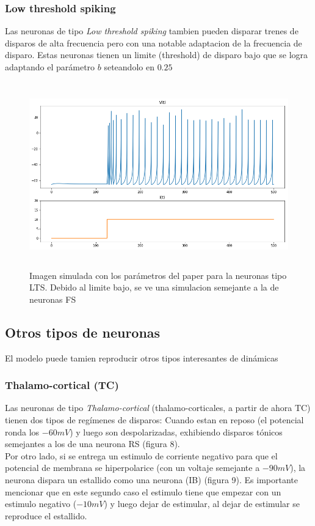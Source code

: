 \documentclass[12pt]{article}
\begin{document}
\subsubsection{Low threshold spiking}
Las neuronas de tipo \textit{Low threshold spiking} tambien pueden disparar trenes de disparos de alta frecuencia pero con una notable adaptacion de la frecuencia de disparo. Estas neuronas tienen un limite (threshold)
de disparo bajo que se logra adaptando el parámetro $b$ seteandolo en $0.25$

\begin{figure}[h!]
    \centering
        \includegraphics[height=8cm]{images/LTS.png}
    \caption[fontsize=2pt]{Imagen simulada con los parámetros del paper para la neuronas tipo LTS. Debido al limite bajo, se ve una simulacion semejante a la de neuronas FS}
\end{figure}
\newpage

\subsection{Otros tipos de neuronas}
El modelo puede tamien reproducir otros tipos interesantes de dinámicas

\subsubsection{Thalamo-cortical (TC)}
Las neuronas de tipo \textit{Thalamo-cortical} (thalamo-corticales, a partir de ahora TC) tienen dos tipos de regímenes de disparos:
Cuando estan en reposo (el potencial ronda los $-60 mV$) y luego son despolarizadas, exhibiendo disparos tónicos semejantes a los de una neurona RS (figura 8). \\
Por otro lado, si se entrega un estimulo de corriente negativo para que el potencial de membrana se hiperpolarice (con un voltaje semejante a $-90 mV$), la neurona dispara un estallido como una neurona (IB) (figura 9).
Es importante mencionar que en este segundo caso el estimulo tiene que empezar con un estimulo negativo ($-10mV$) y luego dejar de estimular, al dejar de estimular se reproduce el estallido.
\end{document}
